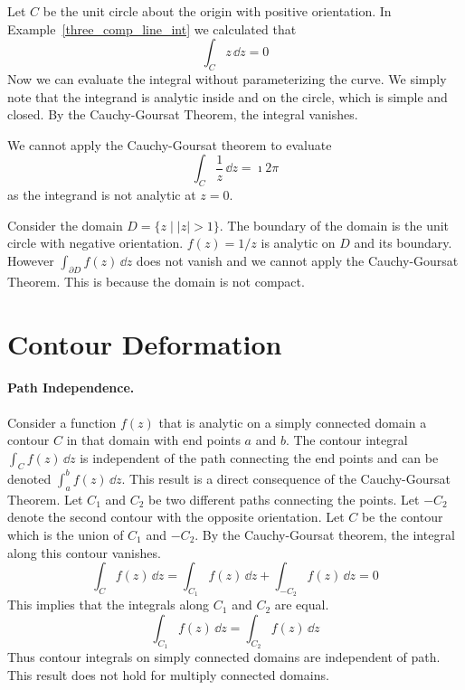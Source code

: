 \begin{Example}
  Let $C$ be the unit circle about the origin with positive orientation.
  In Example~\ref{three_comp_line_int} we calculated that
  \[
  \int_C z \,\dd z = 0
  \]
  Now we can evaluate the integral without parameterizing the curve.
  We simply note that the integrand is analytic inside and on the
  circle, which is simple and closed.  By the Cauchy-Goursat Theorem,
  the integral vanishes.

  We cannot apply the Cauchy-Goursat theorem to evaluate
  \[
  \int_C \frac{1}{z}\,\dd z = \imath 2 \pi
  \]
  as the integrand is not analytic at $z = 0$.
\end{Example}





\begin{Example}
  Consider the domain $D = \{ z \mid |z| > 1 \}$.  The boundary of the domain
  is the unit circle with negative orientation.  $f(z) = 1/z$ is analytic
  on $D$ and its boundary.  However  $\int_{\partial D} f(z)\,\dd z$ does not vanish and
  we cannot apply the Cauchy-Goursat Theorem.  This is because the domain
  is not compact.
\end{Example}










\section{Contour Deformation}




\paragraph{Path Independence.}
Consider a function $f(z)$ that is analytic on a simply connected domain 
a contour $C$ in that domain with end points $a$ and $b$.  
The contour integral $\int_C f(z)\,\dd z$ is independent of the path connecting
the end points and can be denoted $\int_a^b f(z)\,\dd z$.
This result is a direct consequence
of the Cauchy-Goursat Theorem.  Let $C_1$ and $C_2$ be two different paths
connecting the points.   Let $-C_2$ denote the second contour with the
opposite orientation.  Let $C$ be the contour which is the union of 
$C_1$ and $-C_2$.  By the Cauchy-Goursat theorem, the integral along this 
contour vanishes. 
\[
\int_C f(z)\,\dd z = \int_{C_1} f(z) \,\dd z + \int_{-C_2} f(z) \,\dd z = 0
\]
This implies that the integrals along $C_1$ and $C_2$ are equal.
\[
\int_{C_1} f(z)\,\dd z = \int_{C_2} f(z)\,\dd z
\]
Thus contour integrals on simply connected domains are independent of 
path.  This result does not hold for multiply connected domains.

